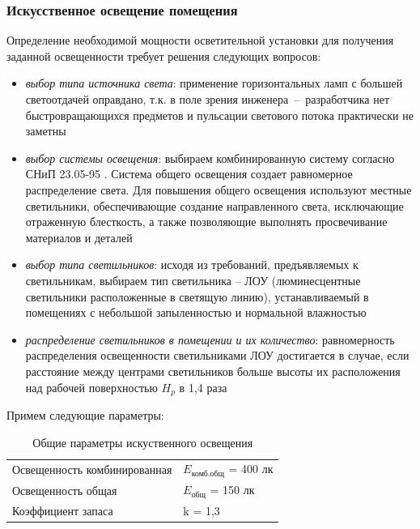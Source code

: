 \subsubsection{Искусственное освещение помещения}

Определение необходимой мощности осветительной установки для получения заданной
освещенности требует решения следующих вопросов:

\begin{itemize}
    \item \textit{выбор типа источника света}: применение горизонтальных ламп с
    большей светоотдачей оправдано, т.к. в поле зрения инженера~--~разработчика
    нет быстровращающихся предметов и пульсации светового потока практически не
    заметны

    \item \textit{выбор системы освещения}: выбираем комбинированную систему
    согласно СНиП 23.05-95 \cite{ecology_snip_23_05_95}. Система общего освещения
    создает равномерное распределение света. Для повышения общего освещения
    используют местные светильники, обеспечивающие создание направленного света,
    исключающие отраженную блесткость, а также позволяющие выполнять просвечивание
    материалов и деталей

    \item \textit{выбор типа светильников}: исходя из требований, предъявляемых
    к светильникам, выбираем тип светильника – ЛОУ (люминесцентные светильники
    расположенные в светящую линию), устанавливаемый в помещениях с небольшой
    запыленностью и нормальной влажностью

    \item \textit{распределение светильников в помещении и их количество}:
    равномерность распределения освещенности светильниками ЛОУ достигается в случае,
    если расстояние между центрами светильников больше высоты их расположения над
    рабочей поверхностью $H_p$ в 1,4 раза
\end{itemize}

Примем следующие параметры:
\begin{table}[h!]
    \centering
    \begin{tabular}{l|l}
        \hline
        Освещенность комбинированная    & $E_\text{комб.общ}$ = 400 лк  \\
        Освещенность общая              & $E_\text{общ}$ = 150 лк       \\
        Коэффициент запаса              & k = 1,3                       \\
        \hline
    \end{tabular}
    \caption{Общие параметры искуственного освещения}
    \label{artificial_lighting_parameters}
\end{table}

